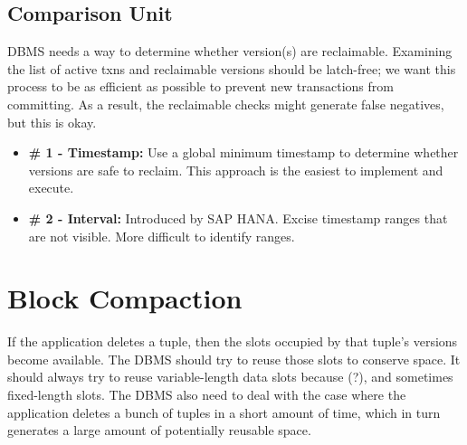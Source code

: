 \documentclass[11pt]{article}
\begin{document}
\subsection*{Comparison Unit}
DBMS needs a way to determine whether version(s) are reclaimable. Examining the list of active txns and reclaimable versions should be latch-free; we want this process to be as efficient as possible to prevent new transactions from committing. As a result, the reclaimable checks might generate false negatives, but this is okay.
\begin{itemize}
    \item \textbf{\# 1 - Timestamp:} Use a global minimum timestamp to determine whether versions are safe to reclaim. This approach is the easiest to implement and execute.
    \item \textbf{\# 2 - Interval:}
    Introduced by SAP HANA. Excise timestamp ranges that are not visible. More difficult to identify ranges. 
\end{itemize}
\section{Block Compaction}
If the application deletes a tuple, then the slots occupied by that tuple's versions become available. The DBMS should try to reuse those slots to conserve space. It should always try to reuse variable-length data slots because (?), and sometimes fixed-length slots. The DBMS also need to deal with the case where the application deletes a bunch of tuples in a short amount of time, which in turn generates a large amount of potentially reusable space.
\end{document}
